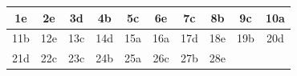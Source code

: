 \begin{enumerate}
\end{enumerate}

\begin{table}[h!]
\centering
\begin{tabular}{|c|c|c|c|c|c|c|c|c|c|}
\hline
1e & 2e & 3d & 4b & 5c & 6e & 7c & 8b & 9c & 10a \\ \hline
11b & 12e & 13c & 14d & 15a & 16a & 17d & 18e & 19b & 20d \\ \hline
21d & 22c & 23c & 24b & 25a & 26c & 27b & 28e &  &  \\ \hline
\end{tabular}
\end{table}



